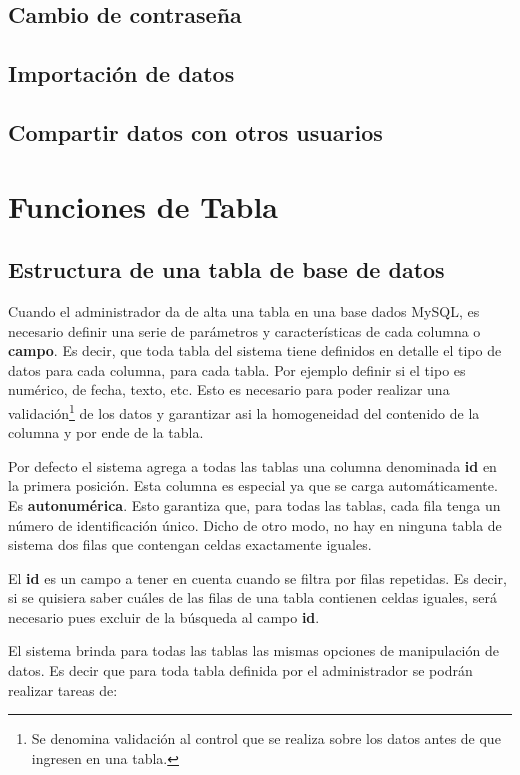 \documentclass[a4paper,10pt]{article}
\begin{document}
\subsection{Cambio de contraseña}
\subsection{Importación de datos}
\subsection{Compartir datos con otros usuarios}


\section{Funciones de Tabla}

\subsection{Estructura de una tabla de base de datos}

Cuando el administrador da de alta una tabla en una base dados MySQL, es necesario definir una serie de parámetros y características de cada columna o \textbf{campo}. Es decir, que toda tabla del sistema tiene  definidos en detalle el tipo de datos para cada columna, para cada tabla. Por ejemplo definir si el tipo es numérico, de fecha, texto, etc. Esto es necesario para poder realizar una validación\footnote{Se denomina validación al control que se realiza sobre los datos antes de que ingresen en una tabla.} de los datos y garantizar asi la homogeneidad del contenido de la columna y por ende de la tabla.

Por defecto el sistema agrega a todas las tablas una columna denominada \textbf{id} en la primera posición. Esta columna es especial ya que se carga automáticamente. Es \textbf{autonumérica}. Esto garantiza que, para todas las tablas, cada fila tenga un número de identificación único. Dicho de otro modo, no hay en ninguna tabla de sistema dos filas que contengan celdas exactamente iguales.

El \textbf{id} es un campo a tener en cuenta cuando se filtra por filas repetidas. Es decir, si se quisiera saber cuáles de las filas de una tabla contienen celdas iguales, será necesario pues excluir de la búsqueda al campo \textbf{id}.

El sistema brinda para todas las tablas las mismas opciones de manipulación de datos. Es decir que para toda tabla definida por el administrador se podrán realizar tareas de:
\end{document}
